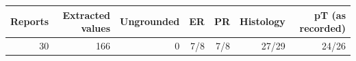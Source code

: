 \begin{tabular}{@{}rrrrrrr@{}}
\toprule
Reports & Extracted values & Ungrounded & ER & PR & Histology & pT (as recorded) \\
\midrule
30 & 166 & 0 & 7/8 & 7/8 & 27/29 & 24/26 \\
\bottomrule
\end{tabular}
